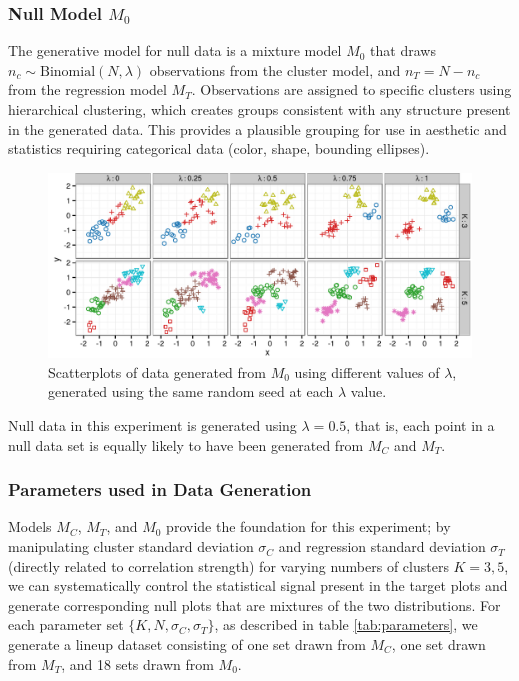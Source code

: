 \documentclass[11pt]{isuthesis}\usepackage[]{graphicx}\usepackage[]{color}
\newenvironment{knitrout}{}{} %
\begin{document}
\subsubsection{Null Model $M_0$}
The generative model for null data is a mixture model $M_0$ that draws $n_c \sim \text{Binomial}(N, \lambda)$ observations from the cluster model, and $n_T = N - n_c$ from the regression model $M_T$. Observations are assigned to specific clusters using hierarchical clustering, which creates groups consistent with any structure present in the generated data. This provides a plausible grouping for use in aesthetic and statistics requiring categorical data (color, shape, bounding ellipses). 

\begin{figure}[ht]
\begin{knitrout}
\color{fgcolor}

{\centering \includegraphics[width=\linewidth]{Figure/FeatureHierarchy/fig-lambda-1} 

}



\end{knitrout}
\caption[Mixing parameter for null model $M_0$]{\label{fig:lambda} Scatterplots of data generated from $M_0$ using different values of $\lambda$, generated using the same random seed at each $\lambda$ value.}
\end{figure}
Null data in this experiment is generated using $\lambda = 0.5$, that is, each point in a null data set is equally likely to have been generated from $M_C$ and $M_T$. 

\subsubsection{Parameters used in Data Generation}\label{sec:parameters}
Models $M_C$, $M_T$, and $M_0$ provide the foundation for this experiment; by manipulating cluster standard deviation $\sigma_C$ and regression standard deviation $\sigma_T$ (directly related to correlation strength) for varying numbers of clusters $K=3, 5$, we can systematically control the statistical signal present in the target plots and generate corresponding null plots that are mixtures of the two distributions. For each parameter set $\{K, N, \sigma_C, \sigma_T\}$, as described in table \ref{tab:parameters}, we  generate a lineup dataset consisting of one set drawn from $M_C$, one set drawn from $M_T$, and 18 sets drawn from $M_0$. 
\end{document}
